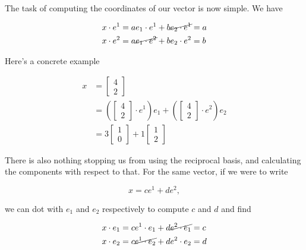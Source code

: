 \documentclass[iop,tighten]{emulateapj}
\begin{document}
The task of computing the coordinates of our vector is now simple.  We have

\begin{equation}\label{eqn:grahamSchmidtLorentz:340}
\begin{aligned}
x \cdot e^1 &= a e_1 \cdot e^1 + b \cancel{e_2 \cdot e^1} = a \\
x \cdot e^2 &= a \cancel{e_1 \cdot e^2} + b e_2 \cdot e^2 = b
\end{aligned}
\end{equation}

Here's a concrete example

\begin{equation}\label{eqn:grahamSchmidtLorentz:230}
\begin{aligned}
x &= 
\begin{bmatrix}
4 \\
2
\end{bmatrix}  \\
&=
\left(
\begin{bmatrix}
4 \\
2
\end{bmatrix} 
\cdot e^1 
\right)
e_1
+
\left(
\begin{bmatrix}
4 \\
2
\end{bmatrix} 
\cdot e^2
\right)
e_2 \\
&= 3 
\begin{bmatrix}
1 \\
0
\end{bmatrix} 
+ 
1
\begin{bmatrix}
1 \\
2
\end{bmatrix}
\end{aligned}
\end{equation}

There is also nothing stopping us from using the reciprocal basis, and calculating the components with respect to that.  For the same vector, if we were to write

\begin{equation}\label{eqn:grahamSchmidtLorentz:250}
x = c e^1 + d e^2,
\end{equation}

we can dot with $e_1$ and $e_2$ respectively to compute $c$ and $d$ and find

\begin{equation}\label{eqn:grahamSchmidtLorentz:360}
\begin{aligned}
x \cdot e_1 &= c e^1 \cdot e_1 + d \cancel{e^2 \cdot e_1} = c \\
x \cdot e_2 &= c \cancel{e^1 \cdot e_2} + d e^2 \cdot e_2 = d
\end{aligned}
\end{equation}
\end{document}
